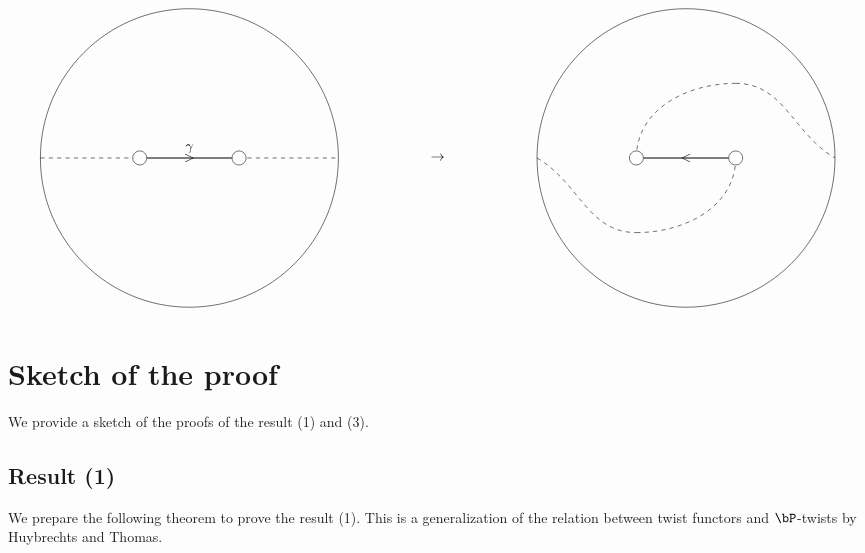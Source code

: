 \documentclass[a0,landscape]{a0poster}
\theoremstyle{plain}
\theoremstyle{definition}
\begin{document}
\begin{multicols}{3}
    \begin{center}
        \centering
        \begin{displaymath}
            \begin{tikzpicture}[scale=2.5]
                \draw (0, 1.5) circle[radius=1.5];
                \draw[thick] (-0.5, 1.5)--(0.5, 1.5);
                \draw(0, 1.5) node{$>$};
                \draw[dashed] (-1.5, 1.5)--(-0.5, 1.5);
                \draw[dashed] (0.5, 1.5)--(1.5, 1.5);

                \foreach \u in {-0.5, 0.5}
                    {
                        \filldraw[white] (\u, 1.5) circle (2pt);
                        \draw[black] (\u, 1.5) circle (2pt);
                    }
                \draw(0, 1.5) node[above]{$\gamma$};

                \draw(2.5, 1.5) node{$\rightarrow$};

                \draw (0+5, 1.5) circle[radius=1.5];
                \draw[thick] (-0.5+5, 1.5)--(0.5+5, 1.5);
                \draw(5, 1.5) node{$<$};


                \draw[dashed](-1.5+5, 1.5) to[out=-30,in=180](-0.5+5, 0.75);
                \draw[dashed](-0.5+5, 0.75) to[out=0,in=-90](0.5+5, 1.5);

                \draw[dashed](-0.5+5, 1.5) to[out=90,in=180](0.5+5, 2.25);
                \draw[dashed](0.5+5, 2.25) to[out=0,in=150](1.5+5, 1.5);


                \foreach \u in {-0.5, 0.5}
                    {
                        \filldraw[white] (\u+5, 1.5) circle (2pt);
                        \draw[black] (\u+5, 1.5) circle (2pt);
                    }
            \end{tikzpicture}
        \end{displaymath}
    \end{center}


    \color{NavyBlue}\section{Sketch of the proof}

    \color{DarkSlateGray}
    We provide a sketch of the proofs of the result (1) and (3).
    \subsection{Result (1)}
    We prepare the following theorem to prove the result (1). This is a generalization of the relation between twist functors and $\bP$-twists by Huybrechts and Thomas.



\end{multicols}
\end{document}
